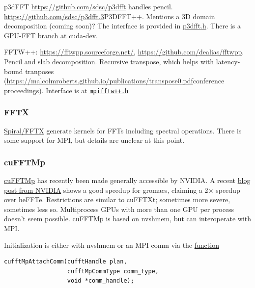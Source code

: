 \documentclass[12pt]{article}
\renewcommand{\(}{\left(}
\renewcommand{\)}{\right)}
\begin{document}
p3dFFT \url{https://github.com/sdsc/p3dfft} handles pencil.
\url{https://github.com/sdsc/p3dfft.3}{P3DFFT++}.  Mentions a 3D
domain decomposition (coming soon)?  The interface is provided in
\href{https://github.com/sdsc/p3dfft/blob/master/include/p3dfft.h}{p3dfft.h}.
There is a GPU-FFT branch at
\href{https://github.com/sdsc/p3dfft.3/tree/cuda-dev}{cuda-dev}.

FFTW++: \url{https://fftwpp.sourceforge.net/},
\url{https://github.com/dealias/fftwpp}.  Pencil and slab
decomposition.  Recursive transpose, which helps with latency-bound
tranposes
(\url{https://malcolmroberts.github.io/publications/transpose0.pdf}{conference
  proceedings}).  Interface is at
\href{https://github.com/dealias/fftwpp/tree/master/mpi/mpifftw++.h}{\texttt{mpifftw++.h}}


\subsubsection{FFTX}

\href{http://www.spiral.net/software/fftx.html}{Spiral/FFTX} generate
kernels for FFTs including spectral operations.  There is some support
for MPI, but details are unclear at this point.

\subsubsection{cuFFTMp}

\href{https://docs.nvidia.com/hpc-sdk/cufftmp/index.html}{cuFFTMp} has
recently been made generally accessible by NVIDIA.  A recent
\href{https://developer.nvidia.com/blog/massively-improved-multi-node-nvidia-gpu-scalability-with-gromacs/}{blog
  post from NVIDIA} shows a good speedup for gromacs, claiming a
2$\times{}$ speedup over heFFTe.  Restrictions are similar to cuFFTXt;
sometimes more severe, sometimes less so.  Multiprocess GPUs with more
than one GPU per process doesn't seem possible.  cuFFTMp is based on
nvshmem, but can interoperate with MPI.

Initialization is either with nvshmem or an MPI comm via the
\href{https://docs.nvidia.com/hpc-sdk/cufftmp/api/index.html#c.cufftMpAttachComm}{function}
\begin{lstlisting}
cufftMpAttachComm(cufftHandle plan,
                  cufftMpCommType comm_type,
                  void *comm_handle);
\end{lstlisting}
\end{document}
